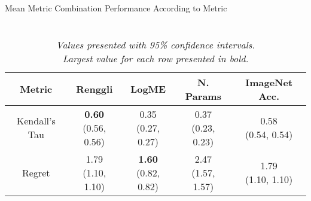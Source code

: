 \begin{table}[H]
\centering
\caption{Mean Metric Combination Performance According to Metric}
\label{tab:mean-combo-results}
\setlength\tabcolsep{1.5pt}
\begin{tabular}{c|cccc}
\textbf{Metric} & \textbf{Renggli} & \textbf{LogME} & \textbf{N. Params} & \textbf{ImageNet Acc.} \\
\hline
Kendall's Tau & \makecell{\textbf{0.60} \\[0pt] (0.56, 0.56)} & \makecell{0.35 \\[0pt] (0.27, 0.27)} & \makecell{0.37 \\[0pt] (0.23, 0.23)} & \makecell{0.58 \\[0pt] (0.54, 0.54)} \\
\hline
Regret & \makecell{1.79 \\[0pt] (1.10, 1.10)} & \makecell{\textbf{1.60} \\[0pt] (0.82, 0.82)} & \makecell{2.47 \\[0pt] (1.57, 1.57)} & \makecell{1.79 \\[0pt] (1.10, 1.10)} \\
\end{tabular}
\caption*{\\\textit{Values presented with 95\% confidence intervals.\\
Largest value for each row presented in bold.}}
\end{table}
